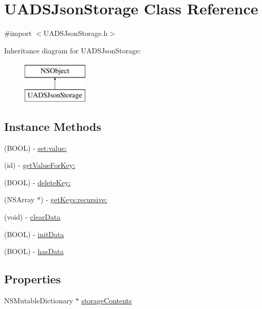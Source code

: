 \hypertarget{interface_u_a_d_s_json_storage}{}\section{U\+A\+D\+S\+Json\+Storage Class Reference}
\label{interface_u_a_d_s_json_storage}


{\ttfamily \#import $<$U\+A\+D\+S\+Json\+Storage.\+h$>$}

Inheritance diagram for U\+A\+D\+S\+Json\+Storage\+:\begin{figure}[H]
\begin{center}
\leavevmode
\includegraphics[height=2.000000cm]{interface_u_a_d_s_json_storage}
\end{center}
\end{figure}
\subsection*{Instance Methods}
\begin{DoxyCompactItemize}
\item 
(B\+O\+OL) -\/ \mbox{\hyperlink{interface_u_a_d_s_json_storage_a754b72e6915c791a59f0655b91106397}{set\+:value\+:}}
\item 
(id) -\/ \mbox{\hyperlink{interface_u_a_d_s_json_storage_a48c6ab4f9032839252139402e9967a8d}{get\+Value\+For\+Key\+:}}
\item 
(B\+O\+OL) -\/ \mbox{\hyperlink{interface_u_a_d_s_json_storage_a6bf047b98773df17c4c7204f4f163c3e}{delete\+Key\+:}}
\item 
(N\+S\+Array $\ast$) -\/ \mbox{\hyperlink{interface_u_a_d_s_json_storage_adaa268af405a0a0a1e33ae2097e84229}{get\+Keys\+:recursive\+:}}
\item 
(void) -\/ \mbox{\hyperlink{interface_u_a_d_s_json_storage_aca481b6fe48e31c6c777faaf9c398ddb}{clear\+Data}}
\item 
(B\+O\+OL) -\/ \mbox{\hyperlink{interface_u_a_d_s_json_storage_a6c2891c939683064ac0f5c64c40ec4b0}{init\+Data}}
\item 
(B\+O\+OL) -\/ \mbox{\hyperlink{interface_u_a_d_s_json_storage_afe49dd5956528449bb7b00bbfa74ee89}{has\+Data}}
\end{DoxyCompactItemize}
\subsection*{Properties}
\begin{DoxyCompactItemize}
\item 
N\+S\+Mutable\+Dictionary $\ast$ \mbox{\hyperlink{interface_u_a_d_s_json_storage_a579b58469c5d3f2a2d83f36f38396d8e}{storage\+Contents}}
\end{DoxyCompactItemize}


